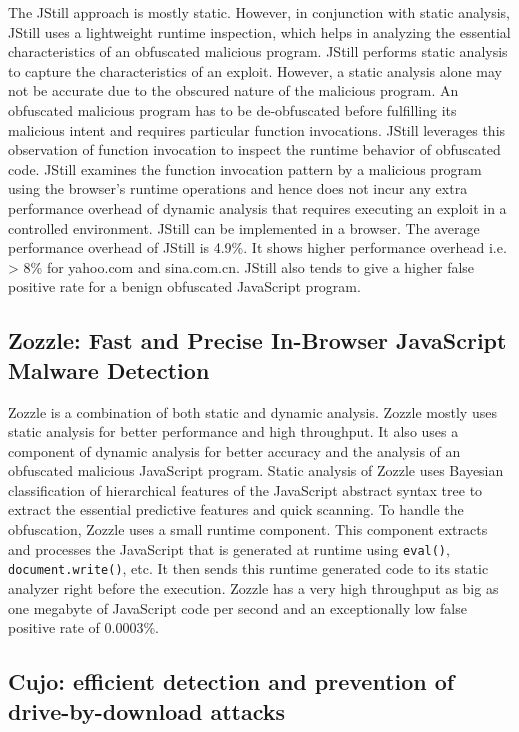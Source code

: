 The JStill approach is mostly static. However, in conjunction with static analysis, JStill uses a lightweight runtime inspection, which helps in analyzing the essential characteristics of an obfuscated malicious program. JStill performs static analysis to capture the characteristics of an exploit. However, a static analysis alone may not be accurate due to the obscured nature of the malicious program. An obfuscated malicious program has to be de-obfuscated before fulfilling its malicious intent and requires particular function invocations. JStill leverages this observation of function invocation to inspect the runtime behavior of obfuscated code. JStill examines the function invocation pattern by a malicious program using the browser's runtime operations and hence does not incur any extra performance overhead of dynamic analysis that requires executing an exploit in a controlled environment.  JStill can be implemented in a browser. The average performance overhead of JStill is 4.9\%. It shows higher performance overhead i.e. > 8\% for yahoo.com and sina.com.cn. JStill also tends to give a higher false positive rate for a benign obfuscated JavaScript program.

\subsection{Zozzle: Fast and Precise In-Browser JavaScript Malware Detection ~\cite{g24}} \label{zozzle}

Zozzle is a combination of both static and dynamic analysis. Zozzle mostly uses static analysis for better performance and high throughput. It also uses a component of dynamic analysis for better accuracy and the analysis of an obfuscated malicious JavaScript program. Static analysis of Zozzle uses Bayesian classification of hierarchical features of the JavaScript abstract syntax tree to extract the essential predictive features and quick scanning. To handle the obfuscation, Zozzle uses a small runtime component. This component extracts and processes the JavaScript that is generated at runtime using \texttt{eval()}, \texttt{document.write()}, etc. It then sends this runtime generated code to its static analyzer right before the execution. Zozzle has a very high throughput as big as one megabyte of JavaScript code per second and an exceptionally low false positive rate of 0.0003\%. 

\subsection{Cujo: efficient detection and prevention of drive-by-download attacks ~\cite{g23}} \label{cujo}

